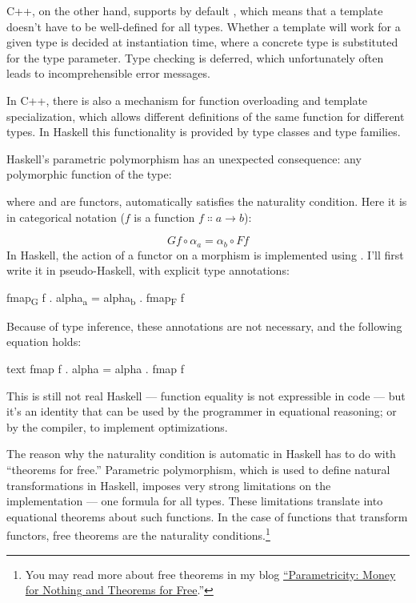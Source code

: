 C++, on the other hand, supports by default ,
which means that a template doesn't have to be well-defined for all
types. Whether a template will work for a given type is decided at
instantiation time, where a concrete type is substituted for the type
parameter. Type checking is deferred, which unfortunately often leads to
incomprehensible error messages.

In C++, there is also a mechanism for function overloading and template
specialization, which allows different definitions of the same function
for different types. In Haskell this functionality is provided by type
classes and type families.

Haskell's parametric polymorphism has an unexpected consequence: any
polymorphic function of the type:

where  and  are functors, automatically satisfies
the naturality condition. Here it is in categorical notation ($f$
is a function $f \Colon a \to b$):

\[G f \circ \alpha_a = \alpha_b \circ F f\]
In Haskell, the action of a functor  on a morphism 
is implemented using . I'll first write it in
pseudo-Haskell, with explicit type annotations:

\begin{snipv}
fmap\textsubscript{G} f . alpha\textsubscript{a} = alpha\textsubscript{b} . fmap\textsubscript{F} f
\end{snipv}
Because of type inference, these annotations are not necessary, and the
following equation holds:

\begin{snip}{text}
fmap f . alpha = alpha . fmap f
\end{snip}
This is still not real Haskell --- function equality is not expressible
in code --- but it's an identity that can be used by the programmer in
equational reasoning; or by the compiler, to implement optimizations.

The reason why the naturality condition is automatic in Haskell has to
do with ``theorems for free.'' Parametric polymorphism, which is used to
define natural transformations in Haskell, imposes very strong
limitations on the implementation --- one formula for all types. These
limitations translate into equational theorems about such functions. In
the case of functions that transform functors, free theorems are the
naturality conditions.\footnote{
You may read more about free theorems in my
blog \href{https://bartoszmilewski.com/2014/09/22/parametricity-money-for-nothing-and-theorems-for-free/}{``Parametricity:
Money for Nothing and Theorems for Free}.''}

